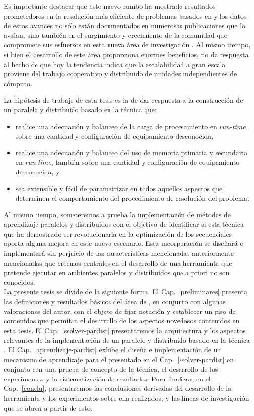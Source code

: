 Es importante destacar que este nuevo rumbo ha mostrado resultados prometedores en la resolución más eficiente de problemas basados en \sat y los datos de estos avances no sólo están documentados en numerosas publicaciones que lo avalan, sino también en el surgimiento y crecimiento de la comunidad que compromete sus esfuerzos en esta nueva área de investigación . Al mismo tiempo, si bien el desarrollo de este área proporciona enormes beneficios, no da respuesta al hecho de que hoy la tendencia indica que la escalabilidad a gran escala proviene del trabajo cooperativo y distribuido de unidades independientes de cómputo.

La hipótesis de trabajo de esta tesis es la de dar respuesta a la construcción de un \ssolver paralelo y distribuido basado en la técnica \gp que:
\begin{itemize}
\item realice una adecuación y balanceo de la carga de procesamiento en \emph{run-time} sobre una cantidad y configuración de equipamiento desconocida,
\item realice una adecuación y balanceo del uso de memoria primaria y secundaria en \emph{run-time}, también sobre una cantidad y configuración de equipamiento desconocida, y
\item sea extensible y fácil de parametrizar en todos aquellos aspectos que determinen el comportamiento del procedimiento de resolución del problema.
\end{itemize}

Al mismo tiempo, someteremos a prueba la implementación de métodos de aprendizaje paralelos y distribuidos con el objetivo de identificar si esta técnica que ha demostrado ser revolucionaria en la optimización de los \ssolvers secuenciales aporta alguna mejora en este nuevo escenario. Esta incorporación se diseñará e implementará sin perjuicio de las características mencionadas anteriormente mencionadas que creemos centrales en el desarrollo de una herramienta que pretende ejecutar en ambientes paralelos y distribuidos que a priori no son conocidos.\\

La presente tesis se divide de la siguiente forma. El Cap.~\ref{preliminares} presenta las definiciones y resultados básicos del área de \sat, en conjunto con algunas valoraciones del autor, con el objeto de fijar notación y establecer un piso de contenidos que permitan el desarrollo de los aspectos novedosos contenidos en esta tesis. El Cap.~\ref{ssolver-pardist} presentaremos la arquitectura y los aspectos relevantes de la implementación de un \ssolver paralelo y distribuido basado en la técnica \gp. El Cap.~\ref{aprendizaje-pardist} exhibe el diseño e implementación de un mecanismo de aprendizaje para el \ssolver presentado en el Cap.~\ref{ssolver-pardist} en conjunto con una prueba de concepto de la técnica, el desarrollo de los experimentos y la sistematización de resultados. Para finalizar, en el Cap.~\ref{conclu}, presentaremos las conclusiones derivadas del desarrollo de la herramienta y los experimentos sobre ella realizados, y las líneas de investigación que se abren a partir de esto.